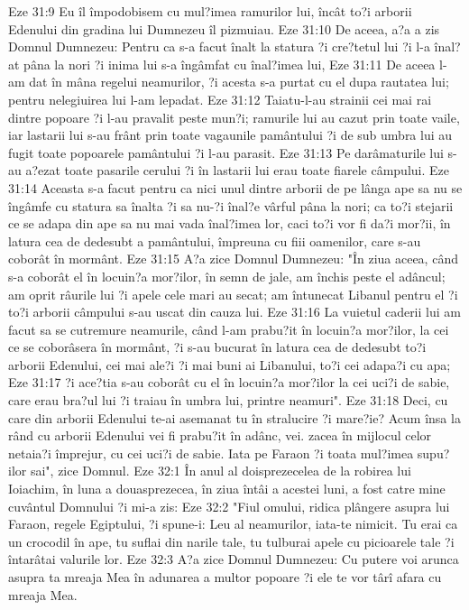 Eze 31:9  Eu îl împodobisem cu mul?imea ramurilor lui, încât to?i arborii Edenului din gradina lui Dumnezeu îl pizmuiau.
Eze 31:10  De aceea, a?a a zis Domnul Dumnezeu: Pentru ca s-a facut înalt la statura ?i cre?tetul lui ?i l-a înal?at pâna la nori ?i inima lui s-a îngâmfat cu înal?imea lui,
Eze 31:11  De aceea l-am dat în mâna regelui neamurilor, ?i acesta s-a purtat cu el dupa rautatea lui; pentru nelegiuirea lui l-am lepadat.
Eze 31:12  Taiatu-l-au strainii cei mai rai dintre popoare ?i l-au pravalit peste mun?i; ramurile lui au cazut prin toate vaile, iar lastarii lui s-au frânt prin toate vagaunile pamântului ?i de sub umbra lui au fugit toate popoarele pamântului ?i l-au parasit.
Eze 31:13  Pe darâmaturile lui s-au a?ezat toate pasarile cerului ?i în lastarii lui erau toate fiarele câmpului.
Eze 31:14  Aceasta s-a facut pentru ca nici unul dintre arborii de pe lânga ape sa nu se îngâmfe cu statura sa înalta ?i sa nu-?i înal?e vârful pâna la nori; ca to?i stejarii ce se adapa din ape sa nu mai vada înal?imea lor, caci to?i vor fi da?i mor?ii, în latura cea de dedesubt a pamântului, împreuna cu fiii oamenilor, care s-au coborât în mormânt.
Eze 31:15  A?a zice Domnul Dumnezeu: "În ziua aceea, când s-a coborât el în locuin?a mor?ilor, în semn de jale, am închis peste el adâncul; am oprit râurile lui ?i apele cele mari au secat; am întunecat Libanul pentru el ?i to?i arborii câmpului s-au uscat din cauza lui.
Eze 31:16  La vuietul caderii lui am facut sa se cutremure neamurile, când l-am prabu?it în locuin?a mor?ilor, la cei ce se coborâsera în mormânt, ?i s-au bucurat în latura cea de dedesubt to?i arborii Edenului, cei mai ale?i ?i mai buni ai Libanului, to?i cei adapa?i cu apa;
Eze 31:17  ?i ace?tia s-au coborât cu el în locuin?a mor?ilor la cei uci?i de sabie, care erau bra?ul lui ?i traiau în umbra lui, printre neamuri".
Eze 31:18  Deci, cu care din arborii Edenului te-ai asemanat tu în stralucire ?i mare?ie? Acum însa la rând cu arborii Edenului vei fi prabu?it în adânc, vei. zacea în mijlocul celor netaia?i împrejur, cu cei uci?i de sabie. Iata pe Faraon ?i toata mul?imea supu?ilor sai", zice Domnul.
Eze 32:1  În anul al doisprezecelea de la robirea lui Ioiachim, în luna a douasprezecea, în ziua întâi a acestei luni, a fost catre mine cuvântul Domnului ?i mi-a zis:
Eze 32:2  "Fiul omului, ridica plângere asupra lui Faraon, regele Egiptului, ?i spune-i: Leu al neamurilor, iata-te nimicit. Tu erai ca un crocodil în ape, tu suflai din narile tale, tu tulburai apele cu picioarele tale ?i întarâtai valurile lor.
Eze 32:3  A?a zice Domnul Dumnezeu: Cu putere voi arunca asupra ta mreaja Mea în adunarea a multor popoare ?i ele te vor târî afara cu mreaja Mea.

